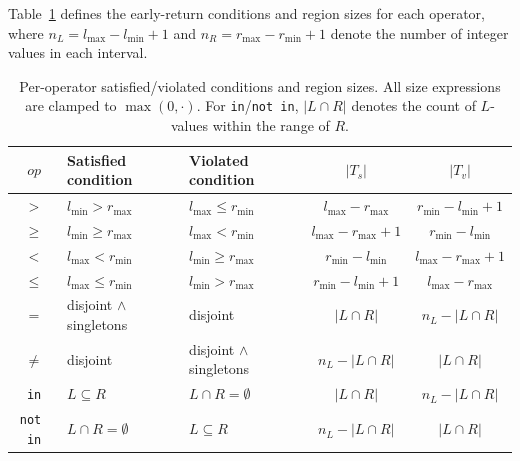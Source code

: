 \documentclass[pdflatex,sn-basic]{sn-jnl}%
\theoremstyle{thmstyleone}%
\theoremstyle{thmstyletwo}%
\theoremstyle{thmstylethree}%
\begin{document}
Table~\ref{tab:op-formulas} defines the early-return conditions and region sizes for each operator, where $n_L = l_{\max} - l_{\min} + 1$ and $n_R = r_{\max} - r_{\min} + 1$ denote the number of integer values in each interval.

\begin{table}[t]
\centering
\caption{Per-operator satisfied/violated conditions and region sizes. All size expressions are clamped to $\max(0, \cdot)$. For \texttt{in}/\texttt{not\,in}, $|L \cap R|$ denotes the count of $L$-values within the range of $R$.}
\label{tab:op-formulas}
\small
\begin{tabular}{cllcc}
\toprule
$op$ & Satisfied condition & Violated condition & $|T_s|$ & $|T_v|$ \\
\midrule
$>$    & $l_{\min} > r_{\max}$    & $l_{\max} \leq r_{\min}$  & $l_{\max} - r_{\max}$     & $r_{\min} - l_{\min} + 1$ \\
$\geq$ & $l_{\min} \geq r_{\max}$ & $l_{\max} < r_{\min}$     & $l_{\max} - r_{\max} + 1$ & $r_{\min} - l_{\min}$     \\
$<$    & $l_{\max} < r_{\min}$    & $l_{\min} \geq r_{\max}$  & $r_{\min} - l_{\min}$     & $l_{\max} - r_{\max} + 1$ \\
$\leq$ & $l_{\max} \leq r_{\min}$ & $l_{\min} > r_{\max}$     & $r_{\min} - l_{\min} + 1$ & $l_{\max} - r_{\max}$     \\
\midrule
$=$    & disjoint $\wedge$ singletons  & disjoint  & $|L \cap R|$ & $n_L - |L \cap R|$ \\
$\neq$ & disjoint  & disjoint $\wedge$ singletons  & $n_L - |L \cap R|$ & $|L \cap R|$ \\
\midrule
\texttt{in}     & $L \subseteq R$ & $L \cap R = \emptyset$ & $|L \cap R|$       & $n_L - |L \cap R|$ \\
\texttt{not\,in} & $L \cap R = \emptyset$ & $L \subseteq R$ & $n_L - |L \cap R|$ & $|L \cap R|$       \\
\bottomrule
\end{tabular}
\end{table}
\end{document}

